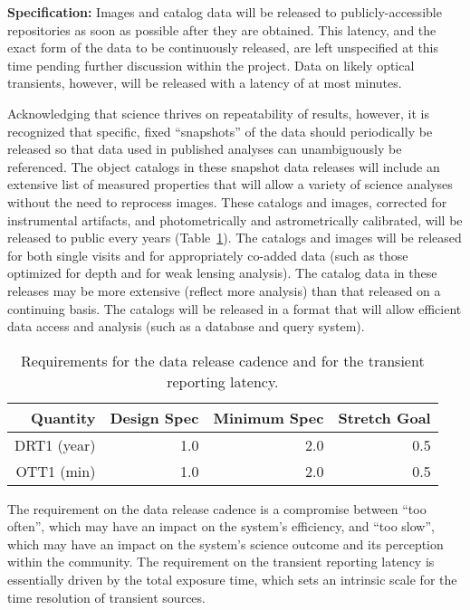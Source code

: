 {\bf Specification:} Images and catalog data will be released to
publicly-accessible repositories as soon as possible after they are
obtained. This latency, and the exact form of the data to be continuously
released, are left unspecified at this time pending further discussion
within the project. Data on likely optical transients, however, will be
released with a latency of at most
minutes.

Acknowledging that science thrives on repeatability of results, however, it
is recognized that specific, fixed ``snapshots'' of the data should
periodically be released so that data used in published analyses can
unambiguously be referenced. The object catalogs in these snapshot data
releases will include an extensive list of measured properties that will
allow a variety of science analyses without the need to reprocess
images. These catalogs and images, corrected for instrumental artifacts,
and photometrically and astrometrically calibrated, will be released to
public every
years (Table~\ref{TDMcadence}). The catalogs and images will be released
for both single visits and for appropriately co-added data (such as those
optimized for depth and for weak lensing analysis). The catalog data in
these releases may be more extensive (\ie reflect more analysis)
than that released on a continuing basis. The catalogs will be released in
a format that will allow efficient data access and analysis (such as a
database and query system).

\begin{table}[h]
\begin{tabular}{|r|r|r|r|}
\hline
     Quantity         &   Design Spec & Minimum Spec  & Stretch Goal   \\
\hline
    DRT1 (year)       &       1.0     &      2.0      &       0.5     \\
    OTT1 (min)        &       1.0     &      2.0      &       0.5     \\
\hline
\end{tabular}
\caption{Requirements for the data release cadence and for the transient
reporting latency.}
\label{TDMcadence}
\end{table}

The requirement on the data release cadence is a compromise between ``too
often'', which may have an impact on the system's efficiency, and ``too
slow'', which may have an impact on the system's science outcome and its
perception within the community.  The requirement on the transient
reporting latency is essentially driven by the total exposure time, which
sets an intrinsic scale for the time resolution of transient sources.

